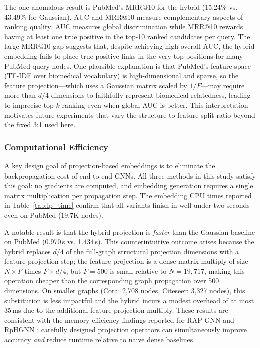 \documentclass[conference]{IEEEtran}
\begin{document}
The one anomalous result is PubMed's MRR@10 for the hybrid (15.24\%
vs. 43.49\% for Gaussian). AUC and MRR@10 measure complementary aspects of
ranking quality: AUC measures global discrimination while MRR@10 rewards
having at least one true positive in the top-10 ranked candidates per query.
The large MRR@10 gap suggests that, despite achieving high overall AUC, the
hybrid embedding fails to place true positive links in the very top positions
for many PubMed query nodes. One plausible explanation is that PubMed's
feature space (TF-IDF over biomedical vocabulary) is high-dimensional and
sparse, so the feature projection---which uses a Gaussian matrix scaled by
$1/F$---may require more than $d/4$ dimensions to faithfully represent
biomedical relatedness, leading to imprecise top-$k$ ranking even when
global AUC is better. This interpretation motivates future experiments that
vary the structure-to-feature split ratio beyond the fixed 3:1 used here.

\subsubsection{Computational Efficiency}

A key design goal of projection-based embeddings is to eliminate the
backpropagation cost of end-to-end GNNs. All three methods in this study
satisfy this goal: no gradients are computed, and embedding generation
requires a single matrix multiplication per propagation step. The embedding
CPU times reported in Table~\ref{tab:lp_time} confirm that all variants
finish in well under two seconds even on PubMed (19.7K nodes).

A notable result is that the hybrid projection is \emph{faster} than the
Gaussian baseline on PubMed (0.970\,s vs. 1.434\,s). This counterintuitive
outcome arises because the hybrid replaces $d/4$ of the full-graph structural
projection dimensions with a feature projection step; the feature projection
is a dense matrix multiply of size $N \times F$ times $F \times d/4$, but
$F = 500$ is small relative to $N = 19{,}717$, making this operation
cheaper than the corresponding graph propagation over 500 dimensions. On
smaller graphs (Cora: 2,708 nodes, Citeseer: 3,327 nodes), this substitution
is less impactful and the hybrid incurs a modest overhead of at most 35\,ms
due to the additional feature projection multiply. These results are
consistent with the memory-efficiency findings reported for RAP-GNN
\cite{bui2023rap} and RpHGNN \cite{hu2021rphgnn}: carefully designed
projection operators can simultaneously improve accuracy \emph{and} reduce
runtime relative to naive dense baselines.
\end{document}
